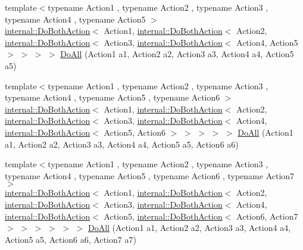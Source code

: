 \begin{DoxyCompactItemize}
\item 
{\footnotesize template$<$typename Action1 , typename Action2 , typename Action3 , typename Action4 , typename Action5 $>$ }\\\mbox{\hyperlink{classtesting_1_1internal_1_1_do_both_action}{internal\+::\+Do\+Both\+Action}}$<$ Action1, \mbox{\hyperlink{classtesting_1_1internal_1_1_do_both_action}{internal\+::\+Do\+Both\+Action}}$<$ Action2, \mbox{\hyperlink{classtesting_1_1internal_1_1_do_both_action}{internal\+::\+Do\+Both\+Action}}$<$ Action3, \mbox{\hyperlink{classtesting_1_1internal_1_1_do_both_action}{internal\+::\+Do\+Both\+Action}}$<$ Action4, Action5 $>$ $>$ $>$ $>$ \mbox{\hyperlink{namespacetesting_a794c41d43373d7af9cebbc7f1c5e4a57}{Do\+All}} (Action1 a1, Action2 a2, Action3 a3, Action4 a4, Action5 a5)
\item 
{\footnotesize template$<$typename Action1 , typename Action2 , typename Action3 , typename Action4 , typename Action5 , typename Action6 $>$ }\\\mbox{\hyperlink{classtesting_1_1internal_1_1_do_both_action}{internal\+::\+Do\+Both\+Action}}$<$ Action1, \mbox{\hyperlink{classtesting_1_1internal_1_1_do_both_action}{internal\+::\+Do\+Both\+Action}}$<$ Action2, \mbox{\hyperlink{classtesting_1_1internal_1_1_do_both_action}{internal\+::\+Do\+Both\+Action}}$<$ Action3, \mbox{\hyperlink{classtesting_1_1internal_1_1_do_both_action}{internal\+::\+Do\+Both\+Action}}$<$ Action4, \mbox{\hyperlink{classtesting_1_1internal_1_1_do_both_action}{internal\+::\+Do\+Both\+Action}}$<$ Action5, Action6 $>$ $>$ $>$ $>$ $>$ \mbox{\hyperlink{namespacetesting_aa6c87c8d7520fb333f1559487d3e06e9}{Do\+All}} (Action1 a1, Action2 a2, Action3 a3, Action4 a4, Action5 a5, Action6 a6)
\item 
{\footnotesize template$<$typename Action1 , typename Action2 , typename Action3 , typename Action4 , typename Action5 , typename Action6 , typename Action7 $>$ }\\\mbox{\hyperlink{classtesting_1_1internal_1_1_do_both_action}{internal\+::\+Do\+Both\+Action}}$<$ Action1, \mbox{\hyperlink{classtesting_1_1internal_1_1_do_both_action}{internal\+::\+Do\+Both\+Action}}$<$ Action2, \mbox{\hyperlink{classtesting_1_1internal_1_1_do_both_action}{internal\+::\+Do\+Both\+Action}}$<$ Action3, \mbox{\hyperlink{classtesting_1_1internal_1_1_do_both_action}{internal\+::\+Do\+Both\+Action}}$<$ Action4, \mbox{\hyperlink{classtesting_1_1internal_1_1_do_both_action}{internal\+::\+Do\+Both\+Action}}$<$ Action5, \mbox{\hyperlink{classtesting_1_1internal_1_1_do_both_action}{internal\+::\+Do\+Both\+Action}}$<$ Action6, Action7 $>$ $>$ $>$ $>$ $>$ $>$ \mbox{\hyperlink{namespacetesting_aadfaf4eb9897dcabe067b1d882febc86}{Do\+All}} (Action1 a1, Action2 a2, Action3 a3, Action4 a4, Action5 a5, Action6 a6, Action7 a7)

\end{DoxyCompactItemize}
